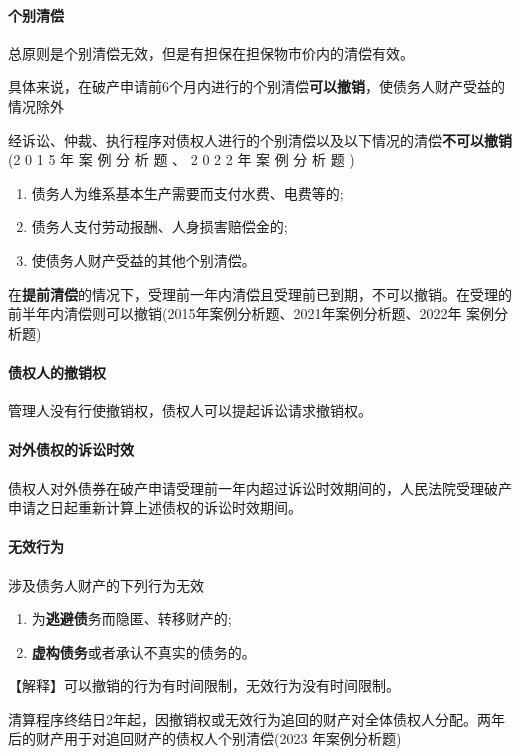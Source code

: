 \documentclass[UTF8,12pt]{ctexart}
\numberwithin{equation}{section} %
\numberwithin{figure}{section}
\numberwithin{table}{section}
\begin{document}
	
	
	\paragraph{个别清偿}
	总原则是个别清偿无效，但是有担保在担保物市价内的清偿有效。
	
	具体来说，在破产申请前6个月内进行的个别清偿\textbf{可以撤销}，使债务人财产受益的情况除外
	
	经诉讼、仲裁、执行程序对债权人进行的个别清偿以及以下情况的清偿\textbf{不可以撤销}(2 0 1 5 年 案 例 分 析 题 、 2 0 2 2 年 案 例 分 析 题 ) 
	\begin{enumerate}
		\item 债务人为维系基本生产需要而支付水费、电费等的; 
		
		\item 债务人支付劳动报酬、人身损害赔偿金的;
		
		\item 使债务人财产受益的其他个别清偿。
	\end{enumerate}
	
	在\textbf{提前清偿}的情况下，受理前一年内清偿且受理前已到期，不可以撤销。在受理的前半年内清偿则可以撤销(2015年案例分析题、2021年案例分析题、2022年 案例分析题)

	
	\paragraph{债权人的撤销权}
	管理人没有行使撤销权，债权人可以提起诉讼请求撤销权。
	
	\paragraph{对外债权的诉讼时效}
	债权人对外债券在破产申请受理前一年内超过诉讼时效期间的，人民法院受理破产申请之日起重新计算上述债权的诉讼时效期间。
	
	\paragraph{无效行为}
	涉及债务人财产的下列行为无效
	\begin{enumerate}
		\item 为\textbf{逃避债}务而隐匿、转移财产的; 
		
		\item \textbf{虚构债务}或者承认不真实的债务的。
	\end{enumerate}
	【解释】可以撤销的行为有时间限制，无效行为没有时间限制。
	
	清算程序终结日2年起，因撤销权或无效行为追回的财产对全体债权人分配。两年后的财产用于对追回财产的债权人个别清偿(2023 年案例分析题)
	
\end{document}
